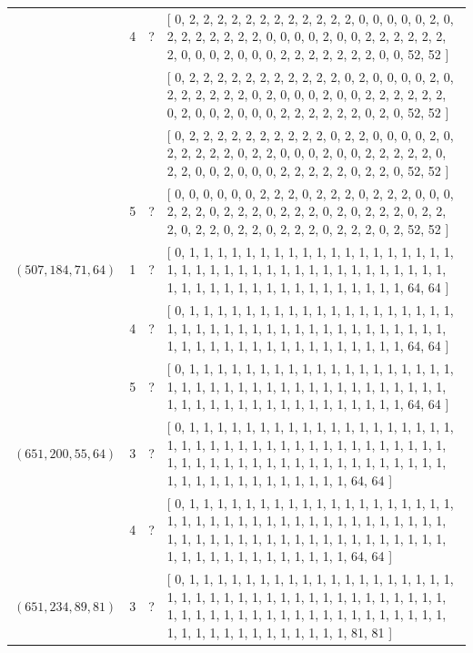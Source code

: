 \documentclass[12pt]{amsproc} %
\theoremstyle{definition}\newtheorem{defn}[thm]{Definition}
\theoremstyle{definition}\newtheorem{rem}[thm]{Remark}
\theoremstyle{definition}\newtheorem{ex}[thm]{Example}
\begin{document}
\begin{center}
\begin{longtable}{p{3.66cm}|P{0.8cm}|P{0.69cm}|p{10cm}}
		   & 4 & ? & [ 0, 2, 2, 2, 2, 2, 2, 2, 2, 2, 2, 2, 2, 0, 0, 0, 0, 0, 2, 0, 2, 2, 2, 2, 2, 2, 2, 0, 0, 0, 0, 2, 0, 0, 2, 2, 2, 2, 2, 2, 2, 0, 0, 0, 2, 0, 0, 0, 2, 2, 2, 2, 2, 2, 2, 0, 0, 52, 52 ] \\
		   &  &  & [ 0, 2, 2, 2, 2, 2, 2, 2, 2, 2, 2, 2, 0, 2, 0, 0, 0, 0, 2, 0, 2, 2, 2, 2, 2, 2, 0, 2, 0, 0, 0, 2, 0, 0, 2, 2, 2, 2, 2, 2, 0, 2, 0, 0, 2, 0, 0, 0, 2, 2, 2, 2, 2, 2, 0, 2, 0, 52, 52 ] \\
		   &  &  & [ 0, 2, 2, 2, 2, 2, 2, 2, 2, 2, 2, 0, 2, 2, 0, 0, 0, 0, 2, 0, 2, 2, 2, 2, 2, 0, 2, 2, 0, 0, 0, 2, 0, 0, 2, 2, 2, 2, 2, 0, 2, 2, 0, 0, 2, 0, 0, 0, 2, 2, 2, 2, 2, 0, 2, 2, 0, 52, 52 ] \\
		   & 5 & ? & [ 0, 0, 0, 0, 0, 0, 2, 2, 2, 0, 2, 2, 2, 0, 2, 2, 2, 0, 0, 0, 2, 2, 2, 0, 2, 2, 2, 0, 2, 2, 2, 0, 2, 0, 2, 2, 2, 0, 2, 2, 2, 0, 2, 2, 0, 2, 2, 0, 2, 2, 2, 0, 2, 2, 2, 0, 2, 52, 52 ] \\
		\hline
		 $(507, 184, 71, 64)$  & 1 & ? & [ 0, 1, 1, 1, 1, 1, 1, 1, 1, 1, 1, 1, 1, 1, 1, 1, 1, 1, 1, 1, 1, 1, 1, 1, 1, 1, 1, 1, 1, 1, 1, 1, 1, 1, 1, 1, 1, 1, 1, 1, 1, 1, 1, 1, 1, 1, 1, 1, 1, 1, 1, 1, 1, 1, 1, 1, 1, 64, 64 ] \\
		   & 4 & ? & [ 0, 1, 1, 1, 1, 1, 1, 1, 1, 1, 1, 1, 1, 1, 1, 1, 1, 1, 1, 1, 1, 1, 1, 1, 1, 1, 1, 1, 1, 1, 1, 1, 1, 1, 1, 1, 1, 1, 1, 1, 1, 1, 1, 1, 1, 1, 1, 1, 1, 1, 1, 1, 1, 1, 1, 1, 1, 64, 64 ] \\
		   & 5 & ? & [ 0, 1, 1, 1, 1, 1, 1, 1, 1, 1, 1, 1, 1, 1, 1, 1, 1, 1, 1, 1, 1, 1, 1, 1, 1, 1, 1, 1, 1, 1, 1, 1, 1, 1, 1, 1, 1, 1, 1, 1, 1, 1, 1, 1, 1, 1, 1, 1, 1, 1, 1, 1, 1, 1, 1, 1, 1, 64, 64 ] \\
		\hline
		 $(651, 200, 55, 64)$  & 3 & ? & [ 0, 1, 1, 1, 1, 1, 1, 1, 1, 1, 1, 1, 1, 1, 1, 1, 1, 1, 1, 1, 1, 1, 1, 1, 1, 1, 1, 1, 1, 1, 1, 1, 1, 1, 1, 1, 1, 1, 1, 1, 1, 1, 1, 1, 1, 1, 1, 1, 1, 1, 1, 1, 1, 1, 1, 1, 1, 1, 1, 1, 1, 1, 1, 1, 1, 1, 1, 1, 1, 1, 1, 1, 1, 64, 64 ] \\
		   & 4 & ? & [ 0, 1, 1, 1, 1, 1, 1, 1, 1, 1, 1, 1, 1, 1, 1, 1, 1, 1, 1, 1, 1, 1, 1, 1, 1, 1, 1, 1, 1, 1, 1, 1, 1, 1, 1, 1, 1, 1, 1, 1, 1, 1, 1, 1, 1, 1, 1, 1, 1, 1, 1, 1, 1, 1, 1, 1, 1, 1, 1, 1, 1, 1, 1, 1, 1, 1, 1, 1, 1, 1, 1, 1, 1, 64, 64 ] \\
		\hline
		 $(651, 234, 89, 81)$  & 3 & ? & [ 0, 1, 1, 1, 1, 1, 1, 1, 1, 1, 1, 1, 1, 1, 1, 1, 1, 1, 1, 1, 1, 1, 1, 1, 1, 1, 1, 1, 1, 1, 1, 1, 1, 1, 1, 1, 1, 1, 1, 1, 1, 1, 1, 1, 1, 1, 1, 1, 1, 1, 1, 1, 1, 1, 1, 1, 1, 1, 1, 1, 1, 1, 1, 1, 1, 1, 1, 1, 1, 1, 1, 1, 1, 81, 81 ] \\

\end{longtable}
\end{center}
\end{document}
